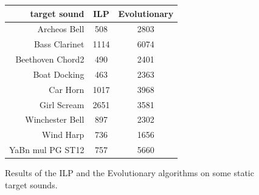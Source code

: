 \documentclass[a4paper]{book}
\begin{document}
\begin{figure}[ht!]

\begin{center}
    \begin{tabular}{r||c|c}%
     \textbf{target sound}&\textbf{ILP}&\textbf{Evolutionary}  \\
     \hline
     Archeos Bell&508&2803\\
Bass Clarinet&1114&6074\\
Beethoven Chord2&490&2401\\
Boat Docking&463&2363\\
Car Horn&1017&3968\\
Girl Scream&2651&3581\\
Winchester Bell&897&2302\\
Wind Harp&736&1656\\
YaBn mul PG ST12&757&5660\\	
\end{tabular}
\caption{Results of the ILP and the Evolutionary algorithms on some static target sounds.}

\label{tab:resultstat}
\end{center}
\end{figure}
\end{document}
